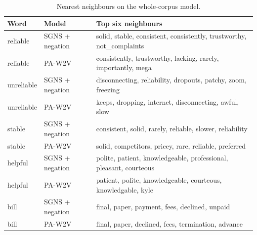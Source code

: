 \begin{table}[H]
\centering
\footnotesize
\caption{Nearest neighbours on the whole-corpus model.}
\label{tab:w2vnn}
\begin{tabular}{llp{9.2cm}}
\toprule
Word & Model & Top six neighbours \\
\midrule
reliable & SGNS + negation & solid, stable, consistent, consistently, trustworthy, not\_complaints \\
reliable & PA-W2V & consistently, trustworthy, lacking, rarely, importantly, mega \\
unreliable & SGNS + negation & disconnecting, reliability, dropouts, patchy, zoom, freezing \\
unreliable & PA-W2V & keeps, dropping, internet, disconnecting, awful, slow \\
stable & SGNS + negation & consistent, solid, rarely, reliable, slower, reliability \\
stable & PA-W2V & solid, competitors, pricey, rare, reliable, preferred \\
helpful & SGNS + negation & polite, patient, knowledgeable, professional, pleasant, courteous \\
helpful & PA-W2V & patient, polite, knowledgeable, courteous, knowledgable, kyle \\
bill & SGNS + negation & final, paper, payment, fees, declined, unpaid \\
bill & PA-W2V & final, paper, declined, fees, termination, advance \\
\bottomrule
\end{tabular}
\end{table}